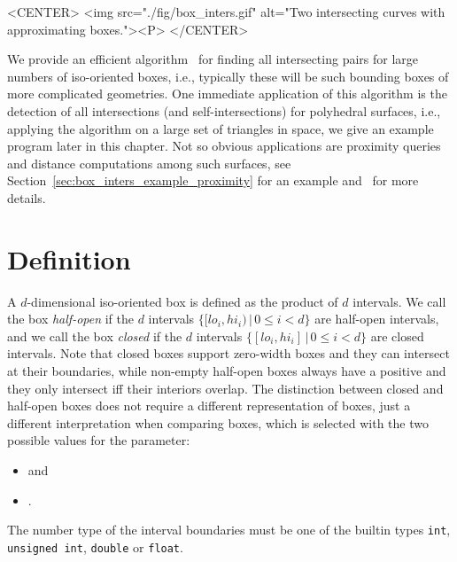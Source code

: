 \begin{ccHtmlOnly}
    <CENTER>
        <img src="./fig/box_inters.gif" alt="Two intersecting curves with
        approximating boxes."><P>
    </CENTER>
\end{ccHtmlOnly}

We provide an efficient algorithm~\cite{cgal:ze-fsbi-02} for finding all
intersecting pairs for large numbers of iso-oriented boxes, i.e.,
typically these will be such bounding boxes of more complicated geometries.
One immediate application of this algorithm is the detection of all
intersections (and self-intersections) for polyhedral surfaces, i.e.,
applying the algorithm on a large set of triangles in space, we give
an example program later in this chapter. Not so obvious applications
are proximity queries and distance computations among such surfaces,
see Section~\ref{sec:box_inters_example_proximity} for an example
and~\cite{cgal:ze-fsbi-02} for more details.  

\section{Definition\label{sec:box-inters-def}}

A $d$-dimensional iso-oriented box is defined as the
 product of $d$ intervals. We call the
box \emph{half-open} if the $d$ intervals $\{ [lo_i,hi_i) \,|\, 0 \leq
i < d\}$ are half-open intervals, and we call the box \emph{closed} if
the $d$ intervals $\{ [lo_i,hi_i] \,|\, 0 \leq i < d\}$ are closed
intervals. Note that closed boxes support zero-width boxes and they
can intersect at their boundaries, while non-empty half-open boxes
always have a positive  and they only intersect iff their
interiors overlap.  The distinction between closed and half-open boxes
does not require a different representation of boxes, just a different
interpretation when comparing boxes, which is selected with the two
possible values for the  parameter:

\begin{itemize}
  \item {} and
  \item {}.
\end{itemize}

The number type of the interval boundaries must be one of the builtin
types \texttt{int}, \texttt{unsigned int}, \texttt{double} or
\texttt{float}.

